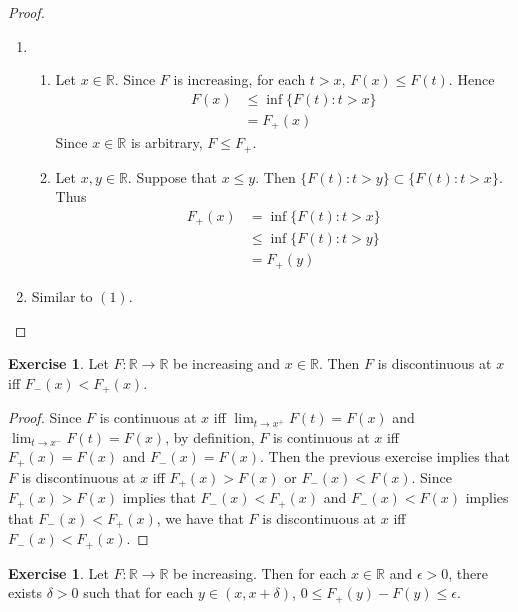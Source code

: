 \documentclass{book}
\theoremstyle{definition}
\newtheorem{ex}[definition]{Exercise}
\newcommand{\del}{\delta}
\newcommand{\ep}{\epsilon}
\newcommand{\R}{\mathbb{R}}
\newcommand{\lex}[1]{\label{ex:#1}}
\DeclareMathOperator*{\0}{\mbf{0}}
\DeclareMathOperator*{\1}{\mbf{1}}
\begin{document}
	\begin{proof}\
		\begin{enumerate}
			\item 
			\begin{enumerate}
				\item  Let $x \in \R$. Since $F$ is increasing, for each $t > x$, $F(x) \leq F(t)$. Hence 
				\begin{align*}
					F(x)
					& \leq \inf \{F(t): t>x \} \\
					& = F_+(x)
				\end{align*}
				Since $x \in \R$ is arbitrary, $F \leq F_+$.
				\item  Let $x,y \in \R$. Suppose that $x \leq y$. Then $\{F(t): t>y \} \subset \{F(t): t>x \}$. Thus 
				\begin{align*}
					F_+(x)
					& = \inf \{F(t): t>x \} \\
					& \leq \inf \{F(t): t>y \} \\
					& = F_+(y)
				\end{align*}
			\end{enumerate}
			\item Similar to $(1)$.
		\end{enumerate}
	\end{proof}

	\begin{ex}
		Let $F:\R \rightarrow \R$ be increasing and $x \in \R$. Then $F$ is discontinuous at $x$ iff $F_-(x) < F_+(x)$.
	\end{ex}

	\begin{proof}
		Since $F$ is continuous at $x$ iff $\lim_{t \rightarrow x^+}F(t) = F(x)$ and $\lim_{t \rightarrow x^-}F(t) = F(x)$, by definition, $F$ is continuous at $x$ iff $F_+(x) = F(x)$ and $F_-(x) = F(x)$. Then the previous exercise implies that $F$ is discontinuous at $x$ iff $F_+(x) > F(x)$ or $F_-(x) < F(x)$. Since $F_+(x) > F(x)$ implies that $F_-(x) < F_+(x)$ and $F_-(x) < F(x)$ implies that $F_-(x) < F_+(x)$, we have that $F$ is discontinuous at $x$ iff $F_-(x) < F_+(x)$.
 	\end{proof}
	
	\begin{ex} \lex{00000} 
		Let $F:\R \rightarrow \R$ be increasing. Then for each $x \in \R$ and $ \ep>0$, there exists $\del >0$ such that for each $y \in (x,x+\del)$, $0 \leq F_+(y) - F(y) \leq \ep$.
	\end{ex}
	
\end{document}
